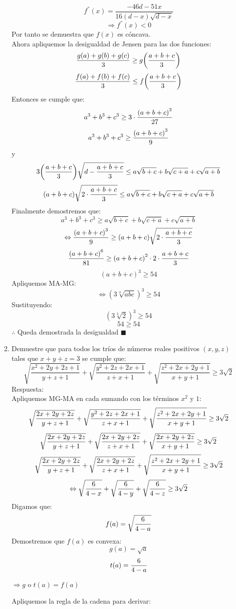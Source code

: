 \documentclass{book}
\begin{document}
\begin{enumerate}
          $$f^{''}(x)=\frac{-46d-51x}{16(d-x) \sqrt{d-x}}$$
          $$\Rightarrow f^{''}(x)<0$$
          Por tanto se demuestra que $f(x)$ es cóncava.\\
          Ahora apliquemos la desigualdad de Jensen para las dos funciones:
          $$\frac{g(a)+g(b)+g(c)}{3}\geq g\bigg({a+b+c\over 3}\bigg)$$
          $$\frac{f(a)+f(b)+f(c)}{3}\leq f\bigg({a+b+c\over 3}\bigg)$$
          Entonces se cumple que:
          $$a^3+b^3+c^3\geq 3\cdot{{(a+b+c)}^3\over 27}$$
          $$a^3+b^3+c^3\geq {{(a+b+c)}^3\over 9}$$
          y
          $$3\bigg({a+b+c\over 3}\bigg) \sqrt{d-{a+b+c\over 3}}\leq a\sqrt{b+c}+b\sqrt{c+a}+c\sqrt{a+b}$$
          $$(a+b+c) \sqrt{2\cdot{a+b+c\over 3}}\leq a\sqrt{b+c}+b\sqrt{c+a}+c\sqrt{a+b}$$
          Finalmente demostremos que:
          $$a^3+b^3+c^3\geq a\sqrt{b+c}+b\sqrt{c+a}+c\sqrt{a+b}$$
          $$\Leftrightarrow {{(a+b+c)}^3\over 9}\geq (a+b+c) \sqrt{2\cdot{a+b+c\over 3}}$$
          $${{(a+b+c)}^6\over 81}\geq{(a+b+c)}^2\cdot 2\cdot{a+b+c\over 3}$$
          $${(a+b+c)}^3\geq 54$$
          Apliquemos MA-MG:
          $$\Leftrightarrow {(3\sqrt[3]{abc})}^3\geq 54$$
          Sustituyendo:
          $${(3\sqrt[3]{2})}^3\geq 54$$
          $$54\geq 54$$
          $\therefore$ Queda demostrada la desigualdad $\blacksquare$\\
    \item Demuestre que para todos los tríos de números reales positivos $(x,y,z)$ tales que $x+y+z= 3$ se cumple que:
          $$\sqrt{\frac{x^2+2y+2z+1}{y+z+1}}+\sqrt{\frac{y^2+2z+2x+1}{z+x+1}}+\sqrt{\frac{z^2+2x+2y+1}{x+y+1}}\geq3\sqrt{2}$$
          Respuesta:\\
          Apliquemos MG-MA en cada sumando con los términos $x^2$ y $1$:
          $$\sqrt{{2x+2y+2z\over y+z+1}}+\sqrt{\frac{y^2+2z+2x+1}{z+x+1}}+\sqrt{\frac{z^2+2x+2y+1}{x+y+1}}\geq3\sqrt{2}$$
          $$\sqrt{{2x+2y+2z\over y+z+1}}+\sqrt{{2x+2y+2z\over z+x+1}}+\sqrt{{2x+2y+2z\over x+y+1}}\geq 3\sqrt{2}$$
          $$\sqrt{{2x+2y+2z\over y+z+1}}+\sqrt{{2x+2y+2z\over z+x+1}}+\sqrt{\frac{z^2+2x+2y+1}{x+y+1}}\geq3\sqrt{2}$$
          $$\Leftrightarrow\sqrt{{6\over 4-x}}+\sqrt{{6\over 4-y}}+\sqrt{{6\over 4-z}}\geq 3\sqrt{2}$$
          Digamos que:
          $$f(a)=\sqrt{{6\over 4-a}}$$
          Demostremos que $f(a)$ es convexa:
          $$g(a)=\sqrt{a}$$
          $$t(a)={6\over 4-a}$$
          \begin{center}
              $\Rightarrow g$ o $ t(a)=f(a)$
          \end{center}
          Apliquemos la regla de la cadena para derivar:

\end{enumerate}
\end{document}
